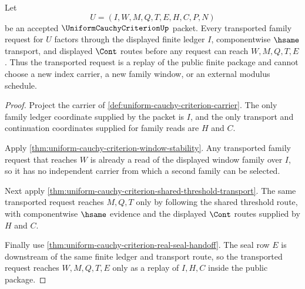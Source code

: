 \begin{theorem}
\label{thm:uniform-cauchy-criterion-finite-index-ledger-transport}
Let
$$
U=(I,W,M,Q,T,E,H,C,P,N)
$$
be an accepted $\UniformCauchyCriterionUp$ packet. Every transported family request for $U$ factors through the displayed finite ledger $I$, componentwise $\hsame$ transport, and displayed $\Cont$ routes before any request can reach $W,M,Q,T,E$. Thus the transported request is a replay of the public finite package and cannot choose a new index carrier, a new family window, or an external modulus schedule.
\end{theorem}
\begin{proof}
Project the carrier of \autoref{def:uniform-cauchy-criterion-carrier}. The only family ledger coordinate supplied by the packet is $I$, and the only transport and continuation coordinates supplied for family reads are $H$ and $C$.

Apply \autoref{thm:uniform-cauchy-criterion-window-stability}. Any transported family request that reaches $W$ is already a read of the displayed window family over $I$, so it has no independent carrier from which a second family can be selected.

Next apply \autoref{thm:uniform-cauchy-criterion-shared-threshold-transport}. The same transported request reaches $M,Q,T$ only by following the shared threshold route, with componentwise $\hsame$ evidence and the displayed $\Cont$ routes supplied by $H$ and $C$.

Finally use \autoref{thm:uniform-cauchy-criterion-real-seal-handoff}. The seal row $E$ is downstream of the same finite ledger and transport route, so the transported request reaches $W,M,Q,T,E$ only as a replay of $I,H,C$ inside the public package.
\end{proof}

